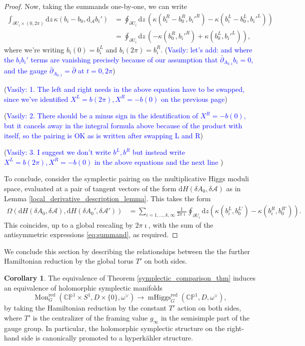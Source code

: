 \documentclass[11pt, oneside, reqno]{amsart}
\theoremstyle{definition} \newtheorem{definition}{Definition}[section]
\newtheorem{corollary}[definition]{Corollary}
\theoremstyle{definition} \newtheorem{remark}[definition]{Remark}
\theoremstyle{definition} \newtheorem{remarks}[definition]{Remarks}
\theoremstyle{definition} \newtheorem{question}[definition]{Question}
\theoremstyle{definition} \newtheorem*{note}{Note}
\theoremstyle{definition} \newtheorem{example}[definition]{Example}
\theoremstyle{definition} \newtheorem{examples}[definition]{Examples}
\newcommand{\bb}[1]{\mathbb{#1}}
\newcommand{\mr}[1]{\mathrm{#1}}
\newcommand{\mc}[1]{\mathcal{#1}}
\newcommand{\dd}{\partial}
\DeclareMathOperator{\mhiggs}{mHiggs}
\DeclareMathOperator{\mon}{Mon}
\renewcommand{\d}{\mathrm{d}}
\newcommand{\vasily}[1]{(\textcolor{blue}{Vasily: #1})}
\begin{document}
\begin{proof}
Now, taking the summands one-by-one, we can write
\begin{align}
 \int_{\dd U_i \times (0,2\pi)} \d z \, \kappa (b_i - b_0, \d_{\mc A}b_i')  &= \oint_{\dd U_i} \d z \, \left(\kappa(b_i^R - b_0^R,b_i'^R) - \kappa(b_i^L - b_0^L,b_i'^L)\right)  \nonumber\\
 &= \oint_{\dd U_i} \d z \, \left(-\kappa(b_0^R,b_i'^R) + \kappa(b_0^L,b_i'^L)\right), \label{eq:summand}
\end{align}
where we're writing $b_i(0) = b_i^L$ and $b_i(2\pi) = b_i^R$.
\vasily{let's add: and where the $b_i b_i'$ terms are vanishing
  precisely because of our assumption that $\bar \partial_{A_{0,1}} b_i = 0$,
and the gauge $ \bar \partial_{A_{0,1}} = \bar \partial$ at $t=0, 2\pi$}

\vasily{1. The left and right needs in the above equation have to be swapped, since
  we've identified $X^{L} = b(2\pi), X^{R} = - b(0)$ on the previous page}

\vasily{2. There should be a minus sign in the identification of $X^R = -b(0)$, but
  it cancels away in the integral formula above because
  of the product with itself, so the pairing is OK as is written after swapping
  L and R}

\vasily{3. I suggest we don't write $b^{L}, b^{R}$ but instead
  write $X^{L} = b(2\pi) , X^{R} = -b(0)$ in the above equations and the next line } 




To conclude, consider the symplectic pairing on the multiplicative Higgs moduli space, evaluated at a pair of tangent vectors of the form $\d H(\delta A_{0}, \delta \mc A)$ as in Lemma \ref{local_derivative_description_lemma}.  This takes the form
\begin{align*}
\Omega(\d H(\delta A_{0}, \delta \mc A), \d H(\delta A_{0}', \delta \mc A')) &= \sum_{i=1, \ldots, k, \infty} \frac 1{2\pi \imath} \oint_{\dd U_i} \d z (\kappa(b^{L}_{i}, b^{L'}_{0})  - \kappa(b^{R}_{i}, b^{R'}_{0})).
\end{align*} 
This coincides, up to a global rescaling by $2 \pi \imath$, with the sum of the antisymmetric expressions \ref{eq:summand}, as required.
\end{proof}

We conclude this section by describing the relationships between the the further Hamiltonian reduction by the global torus $T'$ on both sides.
\begin{corollary}
The equivalence of Theorem \ref{symplectic_comparison_thm} induces an equivalence of holomorphic symplectic manifolds
\[\mon_G^{\mr{red}}(\bb{CP}^1 \times S^1,D \times\{0\},\omega^\vee) \to \mhiggs_G^{\text{red}}(\bb{CP}^1,D,\omega^\vee),\]
by taking the Hamiltonian reduction by the constant $T'$ action on both sides, where $T'$ is the centralizer of the framing value $g_\infty$ in the semisimple part of the gauge group.  In particular, the holomorphic symplectic structure on the right-hand side is canonically promoted to a hyperk\"ahler structure.
\end{corollary}
\end{document}
